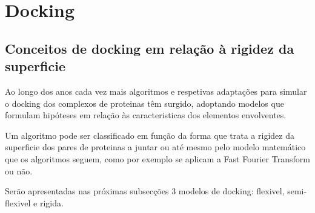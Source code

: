 %



\section{Docking}
\subsection{Conceitos de docking em relação à rigidez da superficie}
\label{classi}
Ao longo dos anos cada vez mais algoritmos e respetivas adaptações para simular o docking dos complexos de proteinas têm surgido, adoptando modelos que formulam hipóteses em relação às caracteristicas dos elementos envolventes. 

Um algoritmo pode ser classificado em função da forma que trata a rigidez  da superficie dos pares de proteinas a juntar ou até mesmo pelo modelo matemático que os algoritmos seguem, como por exemplo se aplicam a Fast Fourier Transform ou não.

Serão apresentadas nas próximas subsecções 3 modelos de docking: flexivel, semi-flexivel e rigida. %



